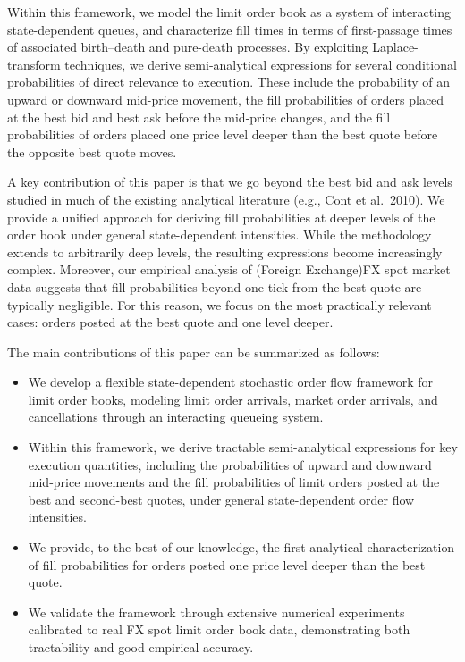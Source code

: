 \documentclass[11pt]{article}
\begin{document}
Within this framework, we model the limit order book as a system of interacting state-dependent queues, and characterize fill times in terms of first-passage times of associated birth--death and pure-death processes. By exploiting Laplace-transform techniques, we derive semi-analytical expressions for several conditional probabilities of direct relevance to execution. These include the probability of an upward or downward mid-price movement, the fill probabilities of orders placed at the best bid and best ask before the mid-price changes, and the fill probabilities of orders placed one price level deeper than the best quote before the opposite best quote moves.

A key contribution of this paper is that we go beyond the best bid and ask levels studied in much of the existing analytical literature (e.g., Cont et al.~2010). We provide a unified approach for deriving fill probabilities at deeper levels of the order book under general state-dependent intensities. While the methodology extends to arbitrarily deep levels, the resulting expressions become increasingly complex. Moreover, our empirical analysis of (Foreign Exchange)FX spot market data suggests that fill probabilities beyond one tick from the best quote are typically negligible. For this reason, we focus on the most practically relevant cases: orders posted at the best quote and one level deeper.

The main contributions of this paper can be summarized as follows:
\begin{itemize}
   \item We develop a flexible state-dependent stochastic order flow framework for limit order books, modeling limit order arrivals, market order arrivals, and cancellations through an interacting queueing system.

    \item Within this framework, we derive tractable semi-analytical expressions for key execution quantities, including the probabilities of upward and downward mid-price movements and the fill probabilities of limit orders posted at the best and second-best quotes, under general state-dependent order flow intensities.

    \item We provide, to the best of our knowledge, the first analytical characterization of fill probabilities for orders posted one price level deeper than the best quote.
    \item We validate the framework through extensive numerical experiments calibrated to real FX spot limit order book data, demonstrating both tractability and good empirical accuracy.
\end{itemize}
\end{document}
